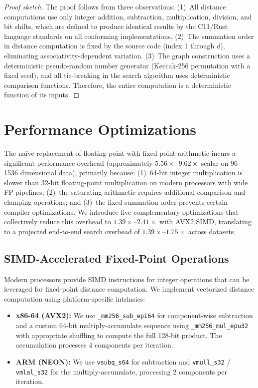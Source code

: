 \documentclass[10pt,journal]{IEEEtran}
\begin{document}
\begin{proof}[Proof sketch]
The proof follows from three observations: (1)~All distance computations use only integer addition, subtraction, multiplication, division, and bit shifts, which are defined to produce identical results by the C11/Rust language standards on all conforming implementations. (2)~The summation order in distance computation is fixed by the source code (index 1 through $d$), eliminating associativity-dependent variation. (3)~The graph construction uses a deterministic pseudo-random number generator (Keccak-256 permutation with a fixed seed), and all tie-breaking in the search algorithm uses deterministic comparison functions. Therefore, the entire computation is a deterministic function of its inputs.
\end{proof}


\section{Performance Optimizations}
\label{sec:optimizations}

The na\"ive replacement of floating-point with fixed-point arithmetic incurs a significant performance overhead (approximately $5.56\times$--$9.62\times$ scalar on 96--1536 dimensional data), primarily because: (1)~64-bit integer multiplication is slower than 32-bit floating-point multiplication on modern processors with wide FP pipelines; (2)~the saturating arithmetic requires additional comparison and clamping operations; and (3)~the fixed summation order prevents certain compiler optimizations. We introduce five complementary optimizations that collectively reduce this overhead to $1.39\times$--$2.41\times$ with AVX2 SIMD, translating to a projected end-to-end search overhead of $1.39\times$--$1.75\times$ across datasets.

\subsection{SIMD-Accelerated Fixed-Point Operations}

Modern processors provide SIMD instructions for integer operations that can be leveraged for fixed-point distance computation. We implement vectorized distance computation using platform-specific intrinsics:

\begin{itemize}[leftmargin=*]
  \item \textbf{x86-64 (AVX2):} We use \texttt{\_mm256\_sub\_epi64} for component-wise subtraction and a custom 64-bit multiply-accumulate sequence using \texttt{\_mm256\_mul\_epu32} with appropriate shuffling to compute the full 128-bit product. The accumulation processes 4 components per iteration.

  \item \textbf{ARM (NEON):} We use \texttt{vsubq\_s64} for subtraction and \texttt{vmull\_s32} / \texttt{vmlal\_s32} for the multiply-accumulate, processing 2 components per iteration.
\end{itemize}
\end{document}
